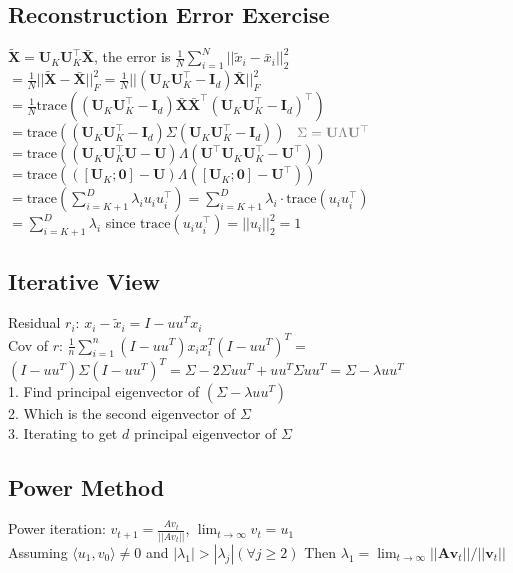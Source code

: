 \subsection*{Reconstruction Error Exercise}
$\tilde {\mathbf{X}} = \mathbf{U}_K \mathbf{U}_K^\top \bar {\mathbf{X}}$, the error is $\frac{1}{N} \sum_{i=1}^N ||\tilde x_i - \bar x_i||_2^2$ \\
$=\frac{1}{N}||\tilde{\mathbf{X}}-\bar{\mathbf{X}}||_F^2 = \frac{1}{N}||(\mathbf{U}_K \mathbf{U}_K^\top - \mathbf{I}_d)\bar{\mathbf{X}}||_F^2$ \\ 
$= \frac{1}{N} \text{trace}((\mathbf{U}_K \mathbf{U}_K^\top - \mathbf{I}_d)\bar{\mathbf{X}} \bar{\mathbf{X}}^\top (\mathbf{U}_K \mathbf{U}_K^\top - \mathbf{I}_d)^\top)$ \\
$=\text{trace}((\mathbf{U}_K \mathbf{U}_K^\top - \mathbf{I}_d) \Sigma (\mathbf{U}_K \mathbf{U}_K^\top - \mathbf{I}_d))$ \ $\textcolor{gray}{\Sigma = \mathbf{U}\Lambda \mathbf{U}^\top}$ \\
$=\text{trace}((\mathbf{U}_K \mathbf{U}_K^\top  \mathbf{U} -  \mathbf{U})\Lambda ( \mathbf{U}^\top \mathbf{U}_K \mathbf{U}_K^\top -  \mathbf{U}^\top))$ \\
$=\text{trace}(([\mathbf{U}_K ;\mathbf{0}] -  \mathbf{U})\Lambda ([\mathbf{U}_K; \mathbf{0}] -  \mathbf{U}^\top)) $ \\
$=\text{trace}(\sum_{i=K+1}^D \lambda_i u_i u_i^\top) = \sum_{i=K+1}^D \lambda_i \cdot \text{trace}(u_i u_i^\top)
$ \\
$=\sum_{i=K+1}^D \lambda_i$ since $\text{trace}(u_i u_i^\top) = ||u_i||_2^2 = 1$
\subsection*{Iterative View}
Residual $r_i$: $x_i - \tilde{x}_i = I - uu^T  x_i$\\
Cov of $r$:  $\frac{1}{n} \sum_{i=1}^n (I-uu^T)x_i x_i^T (I-uu^T)^T =$ \\
$(I-uu^T) \Sigma (I-uu^T)^T = \Sigma - 2\Sigma u u^T + u u^T \Sigma u u ^T = \Sigma - \lambda uu^T$ \\
1. Find principal eigenvector of $(\Sigma - \lambda u u^T)$\\
2. Which is the second eigenvector of $\Sigma$\\
3. Iterating to get $d$ principal eigenvector of $\Sigma$

\subsection*{Power Method}
Power iteration: $v_{t+1} = \frac{Av_t}{||Av_t||}$, $\lim_{t \rightarrow \infty} v_t = u_1$\\
Assuming $\langle u_1, v_0 \rangle \not = 0$ and $|\lambda_1| > |\lambda_j| (\forall j \geq 2)$
Then $\lambda_1 = \lim_{t\to \infty}||\mathbf{Av}_t||/||\mathbf{v}_t||$
